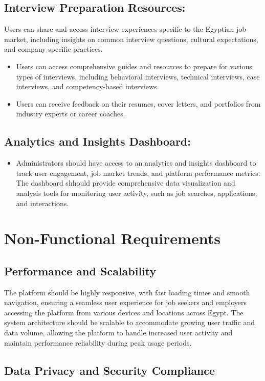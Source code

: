 \documentclass[titlepage]{article}
\begin{document}
\subsection{Interview Preparation Resources:}
Users can share and access interview experiences specific to the Egyptian job market, including insights on common interview questions, cultural expectations, and company-specific practices.
\begin{itemize}
    \item Users can access comprehensive guides and resources to prepare for various types of interviews, including behavioral interviews, technical interviews, case interviews, and competency-based interviews.
    \item Users can receive feedback on their resumes, cover letters, and portfolios from industry experts or career coaches.
\end{itemize}

\subsection{Analytics and Insights Dashboard:}
\begin{itemize}
    \item Administrators should have access to an analytics and insights dashboard to track user engagement, job market trends, and platform performance metrics. The dashboard shhould provide comprehensive data visualization and analysis tools for monitoring user activity, such as job searches, applications, and interactions.
\end{itemize}
\section{Non-Functional Requirements}
\subsection{Performance and Scalability}

The platform   should be highly responsive, with fast loading times and smooth navigation, ensuring a seamless user experience for job seekers and employers accessing the platform from various devices and locations across Egypt.
The system architecture should be scalable to accommodate growing user traffic and data volume, allowing the platform to handle increased user activity and maintain performance reliability during peak usage periods.
\subsection{Data Privacy and Security Compliance}
\end{document}

